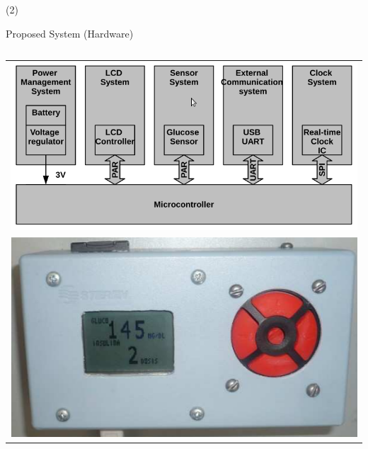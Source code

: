 \begin{frame}{ (2)}
\begin{block}{Proposed System (Hardware)}
\begin{columns}
				\begin{column}{0.48\textwidth}
\begin{center}
     \begin{tabular}{c}
         \includegraphics[width=0.85\linewidth]{Figs/IntelligentGlucometer1}\\
         \includegraphics[width=0.75\linewidth]{Figs/IntelligentGlucometer3}\\
          \end{tabular}
\end{center}
		\end{column}
				\end{columns}

\end{block} 
\end{frame}



